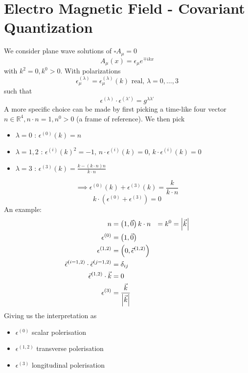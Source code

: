 \documentclass{report}
\begin{document}
\section{Electro Magnetic Field - Covariant Quantization}
We consider plane wave solutions of $\square A_\mu = 0$ \[
A_\mu\left( x \right) = \epsilon_\mu e^{\mp i k x} 
\] with $k^2 = 0, k^{0} > 0$. With polarizations 
\[
\epsilon_\mu^{\left( \lambda \right) } = \epsilon_\mu^{\left( \lambda \right) } \left( k \right) \text{ real, } \lambda = 0,\ldots,3 
\] such that \[
\epsilon^{\left( \lambda \right) } \cdot \epsilon^{\left( \lambda' \right) } = g ^{\lambda \lambda'} 
\] 
A more specific choice can be made by first picking a time-like four vector $n \in \mathbb{R}^{4} , n \cdot  n = 1, n^{0} > 0$ (a frame of reference). We then pick 
\begin{itemize}
  \item $\lambda = 0$ : $\epsilon^{\left( 0 \right) } \left( k \right) = n $
  \item $\lambda = 1,2$ : $\epsilon^{\left( i \right) } \left( k \right) ^2 = - 1$, $n \cdot \epsilon^{\left( i \right) } \left( k \right) = 0$, $k\cdot \epsilon^{\left( i \right) }\left( k \right)  = 0$
  \item $\lambda = 3$ : $\epsilon^{\left( 3 \right) } \left( k \right) = \frac{k - \left( k\cdot n \right) n}{k\cdot n} $
\end{itemize}
\[
\implies \epsilon^{\left( 0 \right) } \left( k \right) + \epsilon^{\left( 3 \right) } \left( k \right) = \frac{k}{k \cdot n} 
\] \[
k\cdot \left( \epsilon^{\left( 0 \right) } + \epsilon^{\left( 3 \right) }  \right) = 0
\] 
An example: 
\begin{align*}
  n &= \left( 1, \vec{0} \right) 
  k\cdot n &=  k^{0} = \abs{\vec{k}}  \\
  \epsilon^{\left( 0 \right) } &= \left( 1, \vec{0}  \right)  \\
  \epsilon^{\left( 1,2 \right) } &= \left( 0, \vec{\epsilon}^{\left( 1,2 \right) }  \right)  \\
  \vec{\epsilon}^{\left( i = 1,2 \right) } \cdot  \vec{\epsilon}^{\left( j = 1,2 \right) } &= \delta_{ij}  \\  
  \vec{\epsilon}^{\left( 1,2 \right) }  \cdot  \vec{k} &=  0 \\
  \epsilon^{\left( 3 \right) } &= \frac{\vec{k}}{\abs{\vec{k}} }
\end{align*}
Giving us the interpretation as
\begin{itemize}
  \item $\epsilon^{\left( 0 \right) } $ scalar polerisation
  \item $\epsilon^{\left( 1,2 \right) } $ transverse polerisation
  \item $\epsilon^{\left( 3 \right) } $ longitudinal polerisation
\end{itemize}
\end{document}
